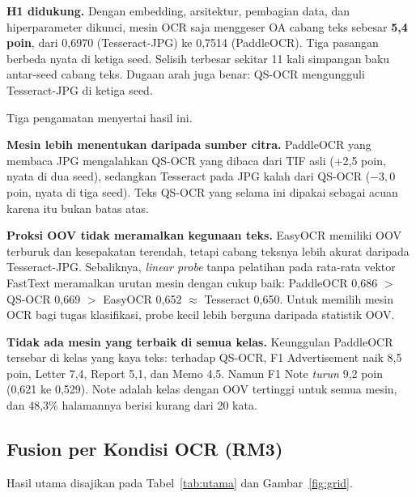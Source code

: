 \textbf{H1 didukung.} Dengan embedding, arsitektur, pembagian data, dan hiperparameter
dikunci, mesin OCR saja menggeser OA cabang teks sebesar \textbf{5,4 poin}, dari 0,6970
(Tesseract-JPG) ke 0,7514 (PaddleOCR). Tiga pasangan berbeda nyata di ketiga seed. Selisih
terbesar sekitar 11 kali simpangan baku antar-seed cabang teks. Dugaan arah juga benar:
QS-OCR mengungguli Tesseract-JPG di ketiga seed.

Tiga pengamatan menyertai hasil ini.

\textbf{Mesin lebih menentukan daripada sumber citra.} PaddleOCR yang membaca JPG
mengalahkan QS-OCR yang dibaca dari TIF asli (+2,5 poin, nyata di dua seed), sedangkan
Tesseract pada JPG kalah dari QS-OCR ($-3{,}0$ poin, nyata di tiga seed). Teks QS-OCR yang
selama ini dipakai sebagai acuan karena itu bukan batas atas.

\textbf{Proksi OOV tidak meramalkan kegunaan teks.} EasyOCR memiliki OOV terburuk dan
kesepakatan terendah, tetapi cabang teksnya lebih akurat daripada Tesseract-JPG.
Sebaliknya, \textit{linear probe} tanpa pelatihan pada rata-rata vektor FastText
meramalkan urutan mesin dengan cukup baik: PaddleOCR 0,686 $>$ QS-OCR 0,669 $>$ EasyOCR
0,652 $\approx$ Tesseract 0,650. Untuk memilih mesin OCR bagi tugas klasifikasi, probe
kecil lebih berguna daripada statistik OOV.

\textbf{Tidak ada mesin yang terbaik di semua kelas.} Keunggulan PaddleOCR tersebar di
kelas yang kaya teks: terhadap QS-OCR, F1 Advertisement naik 8,5 poin, Letter 7,4,
Report 5,1, dan Memo 4,5. Namun F1 Note \emph{turun} 9,2 poin (0,621 ke 0,529). Note
adalah kelas dengan OOV tertinggi untuk semua mesin, dan 48,3\% halamannya berisi kurang
dari 20 kata.

\subsection{Fusion per Kondisi OCR (RM3)}\label{sec:hasil-fusion}

Hasil utama disajikan pada Tabel~\ref{tab:utama} dan Gambar~\ref{fig:grid}.

